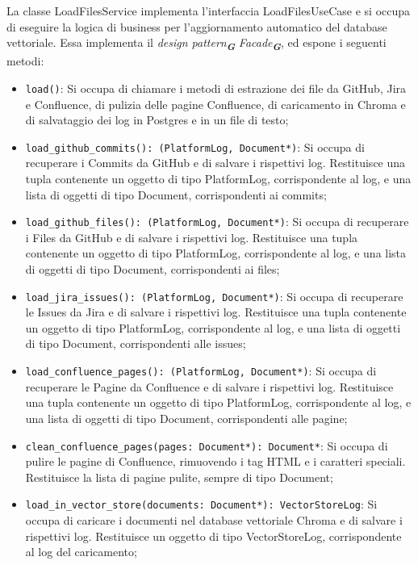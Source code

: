 \label{sec:load_files_service}
La classe LoadFilesService implementa l'interfaccia LoadFilesUseCase e si occupa di eseguire la logica di business per l'aggiornamento automatico del database vettoriale. Essa implementa il \emph{design pattern}\textsubscript{\textbf{\textit{G}}} \emph{Facade}\textsubscript{\textbf{\textit{G}}}, ed espone i seguenti metodi:
\begin{itemize}
    \item \texttt{load()}: Si occupa di chiamare i metodi di estrazione dei file da GitHub, Jira e Confluence, di pulizia delle pagine Confluence, di caricamento in Chroma e di salvataggio dei log in Postgres e in un file di testo;
    \item \texttt{load\_github\_commits(): (PlatformLog, Document*)}: Si occupa di recuperare i Commits da GitHub e di salvare i rispettivi log. Restituisce una tupla contenente un oggetto di tipo PlatformLog, corrispondente al log, e una lista di oggetti di tipo Document, corrispondenti ai commits;
    \item \texttt{load\_github\_files(): (PlatformLog, Document*)}: Si occupa di recuperare i Files da GitHub e di salvare i rispettivi log. Restituisce una tupla contenente un oggetto di tipo PlatformLog, corrispondente al log, e una lista di oggetti di tipo Document, corrispondenti ai files;
    \item \texttt{load\_jira\_issues(): (PlatformLog, Document*)}: Si occupa di recuperare le Issues da Jira e di salvare i rispettivi log. Restituisce una tupla contenente un oggetto di tipo PlatformLog, corrispondente al log, e una lista di oggetti di tipo Document, corrispondenti alle issues;
    \item \texttt{load\_confluence\_pages(): (PlatformLog, Document*)}: Si occupa di recuperare le Pagine da Confluence e di salvare i rispettivi log. Restituisce una tupla contenente un oggetto di tipo PlatformLog, corrispondente al log, e una lista di oggetti di tipo Document, corrispondenti alle pagine;
    \item \texttt{clean\_confluence\_pages(pages: Document*): Document*}: Si occupa di pulire le pagine di Confluence, rimuovendo i tag HTML e i caratteri speciali. Restituisce la lista di pagine pulite, sempre di tipo Document;
    \item \texttt{load\_in\_vector\_store(documents: Document*): VectorStoreLog}: Si occupa di caricare i documenti nel database vettoriale Chroma e di salvare i rispettivi log. Restituisce un oggetto di tipo VectorStoreLog, corrispondente al log del caricamento;

\end{itemize}
